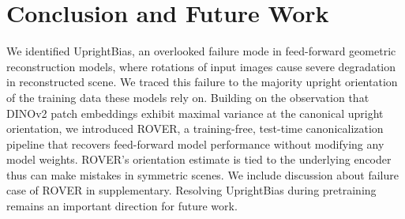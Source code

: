 \section{Conclusion and Future Work}

We identified UprightBias, an overlooked failure mode in feed-forward geometric reconstruction models, where rotations of input images cause severe degradation in reconstructed scene. We traced this failure to the majority upright orientation of the training data these models rely on. Building on the observation that DINOv2 patch embeddings exhibit maximal variance at the canonical upright orientation, we introduced ROVER, a training-free, test-time canonicalization pipeline that recovers feed-forward model performance without modifying any model weights. ROVER's orientation estimate is tied to the underlying encoder thus can make mistakes in symmetric scenes. We include discussion about failure case of ROVER in supplementary. Resolving UprightBias during pretraining remains an important direction for future work.
